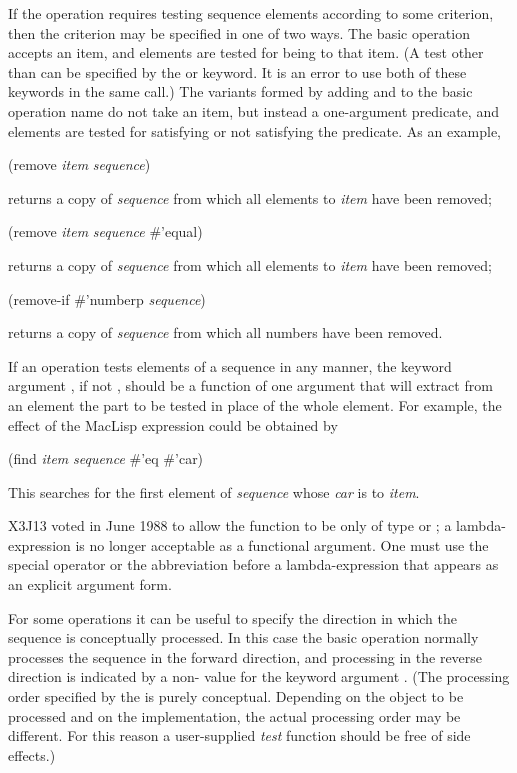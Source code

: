If the operation requires testing sequence elements according to
some criterion, then the criterion may be specified in one of two ways.
The basic operation accepts an item,
and elements are tested for being  to that item.
(A test other than  can be specified by the 
or  keyword.  It is an error to use both
of these keywords in the same call.)
The variants formed by adding  and 
to the basic operation name do not take an item,
but instead a one-argument predicate,
and elements are tested for satisfying or not satisfying the predicate.
As an example,
\begin{lisp}
(remove \emph{item} \emph{sequence})
\end{lisp}
returns a copy of \emph{sequence} from which all elements  to \emph{item}
have been removed;
\begin{lisp}
(remove \emph{item} \emph{sequence}  \#'equal)
\end{lisp}
returns a copy of \emph{sequence} from which all elements  to \emph{item}
have been removed;
\begin{lisp}
(remove-if \#'numberp \emph{sequence})
\end{lisp}
returns a copy of \emph{sequence} from which all numbers have been removed.

If an operation tests elements of a sequence in any manner,
the keyword argument , if not {\false}, should be a function
of one argument that will extract from an element the part to be tested
in place of the whole element.
For example, the effect of the MacLisp expression
 could be obtained by
\begin{lisp}
(find \emph{item} \emph{sequence}  \#'eq  \#'car)
\end{lisp}
This searches for the first element of \emph{sequence} whose \emph{car} is 
to \emph{item}.
\begin{newer}
X3J13 voted in June 1988  to allow the  function
to be only of type  or ; a lambda-expression
is no longer acceptable as a functional argument.  One must use the
 special operator or the abbreviation  before
a lambda-expression that appears as an  explicit argument form.
\end{newer}

For some operations it can be useful to specify the direction
in which the sequence is conceptually processed.  In this case the basic
operation normally processes the sequence in the forward direction,
and processing in the reverse direction is indicated by a non-{\false}
value for the keyword argument .  (The processing order
specified by the  is purely conceptual.  Depending on
the object to be processed and on the implementation, the actual processing
order may be different.  For this reason a user-supplied \emph{test} function
should be free of side effects.)

